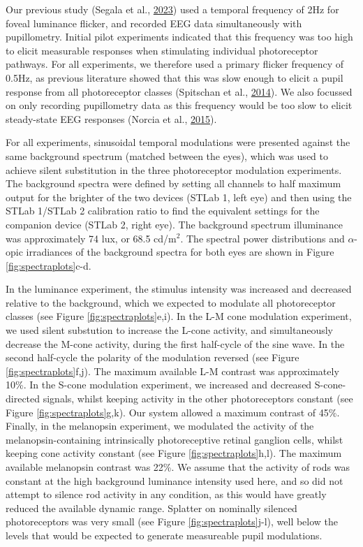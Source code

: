 \documentclass[
]{article}
\begin{document}
Our previous study (Segala et al., \protect\hyperlink{ref-Segala2023}{2023}) used a temporal frequency of 2Hz for foveal luminance flicker, and recorded EEG data simultaneously with pupillometry. Initial pilot experiments indicated that this frequency was too high to elicit measurable responses when stimulating individual photoreceptor pathways. For all experiments, we therefore used a primary flicker frequency of 0.5Hz, as previous literature showed that this was slow enough to elicit a pupil response from all photoreceptor classes (Spitschan et al., \protect\hyperlink{ref-Spitschan2014}{2014}). We also focussed on only recording pupillometry data as this frequency would be too slow to elicit steady-state EEG responses (Norcia et al., \protect\hyperlink{ref-Norcia2015}{2015}).

For all experiments, sinusoidal temporal modulations were presented against the same background spectrum (matched between the eyes), which was used to achieve silent substitution in the three photoreceptor modulation experiments. The background spectra were defined by setting all channels to half maximum output for the brighter of the two devices (STLab 1, left eye) and then using the STLab 1/STLab 2 calibration ratio to find the equivalent settings for the companion device (STLab 2, right eye). The background spectrum illuminance was approximately 74 lux, or 68.5 cd/m\(^2\). The spectral power distributions and \(\alpha\)-opic irradiances of the background spectra for both eyes are shown in Figure \ref{fig:spectraplots}c-d.

In the luminance experiment, the stimulus intensity was increased and decreased relative to the background, which we expected to modulate all photoreceptor classes (see Figure \ref{fig:spectraplots}e,i). In the L-M cone modulation experiment, we used silent substution to increase the L-cone activity, and simultaneously decrease the M-cone activity, during the first half-cycle of the sine wave. In the second half-cycle the polarity of the modulation reversed (see Figure \ref{fig:spectraplots}f,j). The maximum available L-M contrast was approximately 10\%. In the S-cone modulation experiment, we increased and decreased S-cone-directed signals, whilst keeping activity in the other photoreceptors constant (see Figure \ref{fig:spectraplots}g,k). Our system allowed a maximum contrast of 45\%. Finally, in the melanopsin experiment, we modulated the activity of the melanopsin-containing intrinsically photoreceptive retinal ganglion cells, whilst keeping cone activity constant (see Figure \ref{fig:spectraplots}h,l). The maximum available melanopsin contrast was 22\%. We assume that the activity of rods was constant at the high background luminance intensity used here, and so did not attempt to silence rod activity in any condition, as this would have greatly reduced the available dynamic range. Splatter on nominally silenced photoreceptors was very small (see Figure \ref{fig:spectraplots}j-l), well below the levels that would be expected to generate measureable pupil modulations.
\end{document}
